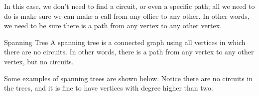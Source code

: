 \begin{center}
\end{center}

In this case, we don't need to find a circuit, or even a specific path; all we need to do is make sure we can make a call from any office to any other.  In other words, we need to be sure there is a path from any vertex to any other vertex.


\begin{definition}{Spanning Tree}{}
A spanning tree is a connected graph using all vertices in which there are no circuits.  
In other words, there is a path from any vertex to any other vertex, but no circuits.   
\end{definition}

Some examples of spanning trees are shown below.  Notice there are no circuits in the trees, and it is fine to have vertices with degree higher than two.\\

